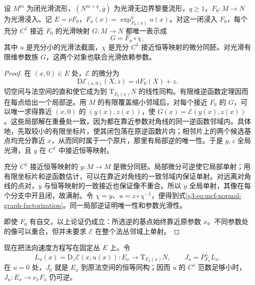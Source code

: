 \begin{lemma}\label{g3:lem:mcf-normal-graph-gauge}
	设 \(M^m\) 为闭光滑流形，\((N^{m+q},\bar g)\) 为光滑无边界黎曼流形，\(q\ge1\)，\(F_0:M\to N\) 为光滑浸入。记 \(E=\nu F_0\)，\(F_u(x)=\exp_{F_0(x)}^{\bar g}u(x)\)。对这一闭浸入 \(F_0\)，每个充分 \(C^1\) 接近 \(F_0\) 的光滑映射 \(G:M\to N\) 都唯一表示成
	\begin{equation}\label{g3:eq:mcf-normal-graph-factorization}
		G=F_u\circ\chi,
	\end{equation}
	其中 \(u\) 是充分小的光滑法截面，\(\chi\) 是充分 \(C^1\) 接近恒等映射的微分同胚。对光滑有限维参数族 \(G\)，这两个对象也联合光滑依赖参数。
\end{lemma}
\begin{proof}
	在 \((x,0)\in E\) 处，\(\mathscr E\) 的微分为
	\[
	\mathrm D\mathscr E_{(x,0)}(X,z)=\mathrm dF_0(X)+z.
	\]
	切空间与法空间的直和使它成为到 \(\mathrm T_{F_0(x)}N\) 的线性同构。有限维逆函数定理因而在每点给出一个局部逆。用 \(M\) 的有限覆盖缩小邻域后，对每个接近 \(F_0\) 的 \(G\)，可以唯一求得靠近 \((x,0)\) 的 \((y(x),z(x))\)，使
	\(G(x)=\mathscr E(y(x),z(x))\)。这些局部解在重叠处一致，因为都在靠近参数对角线的同一逆函数邻域内。具体地，先取较小的有限坐标片，使其闭包落在原逆函数片内；相邻片上的两个候选基点均充分靠近 \(x\)，从而同时属于一个原片，那里有局部逆的唯一性。于是 \(y,z\) 全局光滑，且 \(y\) 在 \(C^1\) 中接近恒等映射。

	充分 \(C^1\) 接近恒等映射的 \(y:M\to M\) 是微分同胚。局部微分可逆使它局部单射；用有限坐标片和逆函数估计，可以在靠近对角线的一致邻域内保证单射。对远离对角线的点对，\(y\) 与恒等映射的一致接近也保证像不重合。所以 \(y\) 全局单射，其像在每个分支中开且闭，故满射。令 \(\chi=y\)、\(u=z\circ\chi^{-1}\)，便得到式\eqref{g3:eq:mcf-normal-graph-factorization}。同一局部逆证明唯一性和参数光滑性。

	即使 \(F_0\) 有自交，以上论证仍成立：所选逆的基点始终靠近原参数 \(x\)。不同参数处的像可以重合，但并未要求 \(\mathscr E\) 在整个法丛邻域上单射。
\end{proof}

现在把法向速度方程写在固定丛 \(E\) 上。令
\[
L_u(x)=\mathrm D_z\mathscr E(x,u(x)):E_x\longrightarrow\mathrm T_{F_u(x)}N,
\qquad J_u=P_{F_u}^\perp L_u.
\]
在 \(u=0\) 处，\(J_0\) 就是 \(E_x\) 到原法空间的恒等同构；因而 \(u\) 的 \(C^1\) 范数足够小时，\(J_u:E_x\to\nu_xF_u\) 仍可逆。

